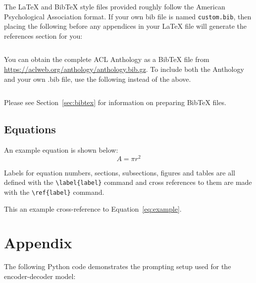 \documentclass[11pt]{article}
\begin{document}
\nocite{Ando2005,andrew2007scalable,rasooli-tetrault-2015}

The \LaTeX{} and Bib\TeX{} style files provided roughly follow the American Psychological Association format.
If your own bib file is named \texttt{custom.bib}, then placing the following before any appendices in your \LaTeX{} file will generate the references section for you:
\begin{quote}
\begin{verbatim}

\end{verbatim}
\end{quote}

You can obtain the complete ACL Anthology as a Bib\TeX{} file from \url{https://aclweb.org/anthology/anthology.bib.gz}.
To include both the Anthology and your own .bib file, use the following instead of the above.
\begin{quote}
\begin{verbatim}

\end{verbatim}
\end{quote}

Please see Section~\ref{sec:bibtex} for information on preparing Bib\TeX{} files.

\subsection{Equations}

An example equation is shown below:
\begin{equation}
  \label{eq:example}
  A = \pi r^2
\end{equation}

Labels for equation numbers, sections, subsections, figures and tables
are all defined with the \verb|\label{label}| command and cross references
to them are made with the \verb|\ref{label}| command.

This an example cross-reference to Equation~\ref{eq:example}.


\appendix
\section{Appendix}
\label{app:prompting}
The following Python code demonstrates the prompting setup used for the encoder-decoder model:
\end{document}
